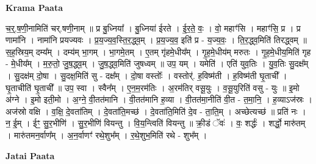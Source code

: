 \documentclass[17pt]{extarticle}
\begin{document}
\textbf{Krama Paata} \newline

च॒र्॒.ष॒णी॒नामिति॑ चर्.षणी॒नाम् ॥ प्र बु॒ध्निया᳚ । बु॒ध्निया॑ ईरते । ई॒र॒ते॒ वः॒ । वो॒ महाꣳ॑सि । महाꣳ॑सि॒ प्र । 
प्र णामा॑नि । नामा॑नि प्रयज्यवः । प्र॒य॒ज्य॒व॒स्ति॒र॒द्ध्व॒म् । प्र॒य॒ज्य॒व॒ इति॑ प्र - य॒ज्य॒वः॒ । ति॒र॒द्ध्व॒मिति॑ तिरद्ध्वम् ॥ स॒ह॒स्रिय॒म् दम्य᳚म् । दम्य॑म् भा॒गम् । भा॒गमे॒तम् । ए॒तम् गृ॑हमे॒धीय᳚म् । गृ॒ह॒मे॒धीय॑म् मरुतः । गृ॒ह॒मे॒धीय॒मिति॑ गृह - मे॒धीय᳚म् । म॒रु॒तो॒ जु॒ष॒द्ध्व॒म् । जु॒ष॒द्ध्व॒मिति॑ जुषध्वम् ॥ उप॒ यम् । यमेति॑ । एति॑ युव॒तिः । यु॒व॒तिः सु॒दक्ष᳚म् । सु॒दक्ष॑म् दो॒षा । सु॒दक्ष॒मिति॑ सु - दक्ष᳚म् । दो॒षा वस्तोः᳚ । वस्तोर्॑. ह॒विष्म॑ती । ह॒विष्म॑ती घृ॒ताची᳚ । घृ॒ताचीति॑ घृ॒ताची᳚ ॥ उप॒ स्वा । स्वैन᳚म् । ए॒न॒म॒रम॑तिः । अ॒रम॑तिर् वसू॒युः । व॒सू॒युरिति॑ वसु - युः ॥ इ॒मो अ॑ग्ने । इ॒मो इती॒मो । अ॒ग्ने॒ वी॒तत॑मानि । वी॒तत॑मानि ह॒व्या । वी॒तत॑मा॒नीति॑ वी॒त - त॒मा॒नि॒ । ह॒व्याऽज॑स्रः । अज॑स्रो वक्षि । 
व॒क्षि॒ दे॒वता॑तिम् । दे॒वता॑ति॒मच्छ॑ । दे॒वता॑ति॒मिति॑ दे॒व - 
ता॒ति॒म् । अच्छेत्यच्छ॑ ॥ प्रति॑ नः । न॒ ई॒म् । ईꣳ॒॒ सु॒र॒भीणि॑ । सु॒र॒भीणि॑ वियन्तु । वि॒य॒न्त्विति॑ वियन्तु ॥ क्री॒डं ॅवः॑ । वः॒ शर्द्धः॑ । शर्द्धो॒ मारु॑तम् । मारु॑तमन॒र्वाण᳚म् । अ॒न॒र्वाणꣳ॑ रथे॒शुभ᳚म् । र॒थे॒शुभ॒मिति॑ रथे - शुभ᳚म् । \newline

\textbf{Jatai Paata} \newline
\end{document}
